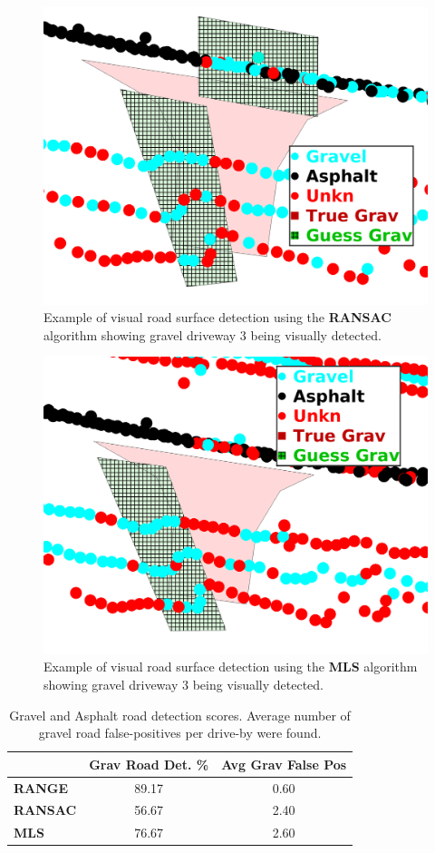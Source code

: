 \documentclass[numbered,pdftex]{ohio-etd}
\begin{document}
{{		\begin{figure}[H]
			\centering
			\includegraphics[width=0.5\linewidth]{Defense_Images/ransac_db_6_overlap_2}
			\caption[Visual Scores: RANSAC]{Example of visual road surface detection using the \textbf{RANSAC} algorithm showing gravel driveway $3$ being visually detected.}
			\label{fig:ransac_example_vis_score}
		\end{figure}
		
		\begin{figure}[H]
			\centering
			\includegraphics[width=0.5\linewidth]{Defense_Images/mls_db_6_overlap_2}
			\caption[Visual Scores: MLS]{Example of visual road surface detection using the \textbf{MLS} algorithm showing gravel driveway $3$ being visually detected.}
			\label{fig:mls_example_vis_score}
		\end{figure}
		
		\begin{table}[H]
			\centering
			\begin{tabular}{l|c|c}
									& Grav Road Det. \% 	& Avg Grav False Pos\footnotemark	\\
				\hline
				\textbf{RANGE}  	& 89.17       			& 0.60	\\[-4pt]
				\textbf{RANSAC} 	& 56.67       			& 2.40	\\[-4pt]
				\textbf{MLS}    	& 76.67 				& 2.60		
			\end{tabular}
			\caption[Road Area Detection Score]{Gravel and Asphalt road detection scores. Average number of gravel road false-positives per drive-by were found.}
			\label{tab:road_area_overlap_score}
		\end{table}
	
}}
\end{document}
